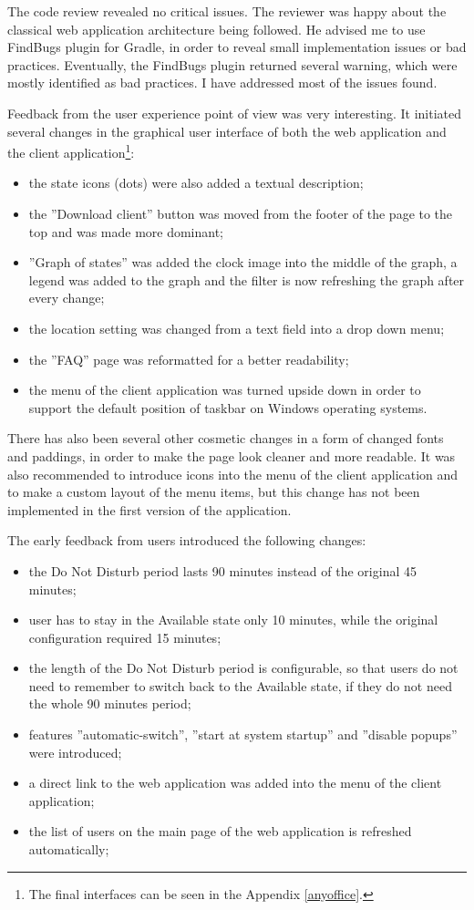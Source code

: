 \documentclass[11pt,singleside]{myfithesis2}
\begin{document}
The code review revealed no critical issues. The reviewer was happy about the classical web application architecture being followed. He advised me to use FindBugs plugin for Gradle, in order to reveal small implementation issues or bad practices. Eventually, the FindBugs plugin returned several warning, which were mostly identified as bad practices. I have addressed most of the issues found.

Feedback from the user experience point of view was very interesting. It initiated several changes in the graphical user interface of both the web application and the client application\footnote{The final interfaces can be seen in the Appendix \ref{anyoffice}.}:
\begin{itemize}
	\item the state icons (dots) were also added a textual description;
	\item the ''Download client'' button was moved from the footer of the page to the top and was made more dominant;
	\item ''Graph of states'' was added the clock image into the middle of the graph, a legend was added to the graph and the filter is now refreshing the graph after every change;
	\item the location setting was changed from a text field into a drop down menu;
	\item the ''FAQ'' page was reformatted for a better readability;
	\item the menu of the client application was turned upside down in order to support the default position of taskbar on Windows operating systems.
\end{itemize}
There has also been several other cosmetic changes in a form of changed fonts and paddings, in order to make the page look cleaner and more readable. It was also recommended to introduce icons into the menu of the client application and to make a custom layout of the menu items, but this change has not been implemented in the first version of the application.

The early feedback from users introduced the following changes:
\begin{itemize}
	\item the Do Not Disturb period lasts 90 minutes instead of the original 45 minutes;
	\item user has to stay in the Available state only 10 minutes, while the original configuration required 15 minutes;
	\item the length of the Do Not Disturb period is configurable, so that users do not need to remember to switch back to the Available state, if they do not need the whole 90 minutes period;
	\item features ''automatic-switch'', ''start at system startup'' and ''disable popups''  were introduced;
	\item a direct link to the web application was added into the menu of the client application;
	\item the list of users on the main page of the web application is refreshed automatically;
\end{itemize}
\end{document}
